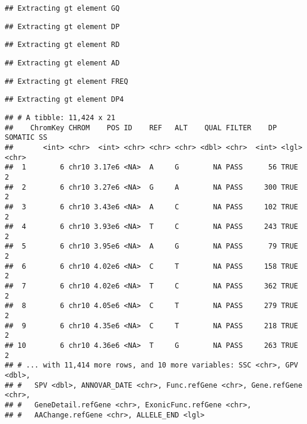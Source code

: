 \documentclass[]{article}
\newenvironment{Shaded}{\begin{snugshade}}{\end{snugshade}}
\newcommand{\NormalTok}[1]{#1}
\newcommand{\OperatorTok}[1]{\textcolor[rgb]{0.81,0.36,0.00}{\textbf{#1}}}
\begin{document}
\begin{verbatim}
## Extracting gt element GQ
\end{verbatim}

\begin{verbatim}
## Extracting gt element DP
\end{verbatim}

\begin{verbatim}
## Extracting gt element RD
\end{verbatim}

\begin{verbatim}
## Extracting gt element AD
\end{verbatim}

\begin{verbatim}
## Extracting gt element FREQ
\end{verbatim}

\begin{verbatim}
## Extracting gt element DP4
\end{verbatim}

\begin{Shaded}
\end{Shaded}

\begin{verbatim}
## # A tibble: 11,424 x 21
##    ChromKey CHROM    POS ID    REF   ALT    QUAL FILTER    DP SOMATIC SS   
##       <int> <chr>  <int> <chr> <chr> <chr> <dbl> <chr>  <int> <lgl>   <chr>
##  1        6 chr10 3.17e6 <NA>  A     G        NA PASS      56 TRUE    2    
##  2        6 chr10 3.27e6 <NA>  G     A        NA PASS     300 TRUE    2    
##  3        6 chr10 3.43e6 <NA>  A     C        NA PASS     102 TRUE    2    
##  4        6 chr10 3.93e6 <NA>  T     C        NA PASS     243 TRUE    2    
##  5        6 chr10 3.95e6 <NA>  A     G        NA PASS      79 TRUE    2    
##  6        6 chr10 4.02e6 <NA>  C     T        NA PASS     158 TRUE    2    
##  7        6 chr10 4.02e6 <NA>  T     C        NA PASS     362 TRUE    2    
##  8        6 chr10 4.05e6 <NA>  C     T        NA PASS     279 TRUE    2    
##  9        6 chr10 4.35e6 <NA>  C     T        NA PASS     218 TRUE    2    
## 10        6 chr10 4.36e6 <NA>  T     G        NA PASS     263 TRUE    2    
## # ... with 11,414 more rows, and 10 more variables: SSC <chr>, GPV <dbl>,
## #   SPV <dbl>, ANNOVAR_DATE <chr>, Func.refGene <chr>, Gene.refGene <chr>,
## #   GeneDetail.refGene <chr>, ExonicFunc.refGene <chr>,
## #   AAChange.refGene <chr>, ALLELE_END <lgl>
\end{verbatim}
\end{document}
